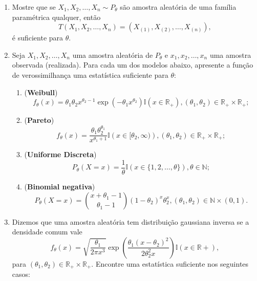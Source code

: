 \documentclass[a4paper,10pt, notitlepage]{report}
\newcommand{\rs}{X_1, X_2, \ldots, X_n} %
\newcommand{\rsd}{x_1, x_2, \ldots, x_n} %
\newcommand{\rpl}{\mathbb{R}_+}
\begin{document}
\begin{enumerate}
    \item Mostre que se $\rs \sim P_\theta$ são amostra aleatória de uma família paramétrica qualquer, então
    $$T(\rs) = (X_{(1)}, X_{(2)}, \ldots, X_{(n)}),$$
    é suficiente para $\theta$.
    \item Seja $\rs$ uma amostra aleatória de $P_\theta$ e $\rsd$ uma amostra observada (realizada).
    Para cada um dos modelos abaixo, apresente a função de verossimilhança uma estatística suficiente para $\theta$:
    \begin{enumerate}
        \item (\textbf{Weibull})
        \begin{equation*}
            f_\theta(x) = \theta_1\theta_2 x^{\theta_2-1}\exp\left(-\theta_1 x^{\theta_2}\right)\mathbb{I}(x \in \rpl), (\theta_1, \theta_2) \in \rpl \times \rpl;
        \end{equation*}
        \item (\textbf{Pareto}) 
        \begin{equation*}
            f_\theta(x) = \frac{\theta_1\theta_2^{\theta_1}}{x^{\theta_1 + 1}}\mathbb{I}\left(x \in [\theta_2, \infty)\right), (\theta_1, \theta_2) \in \rpl \times \rpl;
        \end{equation*}
        \item (\textbf{Uniforme Discreta})
        \begin{equation*}
            P_\theta(X = x) = \frac{1}{\theta}\mathbb{I}(x \in \{1, 2, \ldots,\theta\}), \theta \in \mathbb{N};
        \end{equation*}
        \item (\textbf{Binomial negativa})
        \begin{equation*}
            P_\theta(X = x) = \binom{x + \theta_1 - 1}{\theta_1-1}(1-\theta_2)^x \theta_2^x, (\theta_1, \theta_2) \in \mathbb{N} \times (0, 1).
        \end{equation*}
    \end{enumerate}
    \item Dizemos que uma amostra aleatória tem distribuição gaussiana inversa se a densidade comum vale
    \begin{equation*}
        f_\theta(x) = \sqrt{\frac{\theta_1}{2\pi x^3}} \exp\left(\frac{\theta_1(x-\theta_2)^2}{2\theta_2^2x}\right)\mathbb{I}(x \in \mathbb{R}+),
    \end{equation*}
    para $(\theta_1, \theta_2) \in \rpl \times \mathbb{R}_{+}$.
    Encontre uma estatística suficiente nos seguintes casos:

\end{enumerate}
\end{document}
